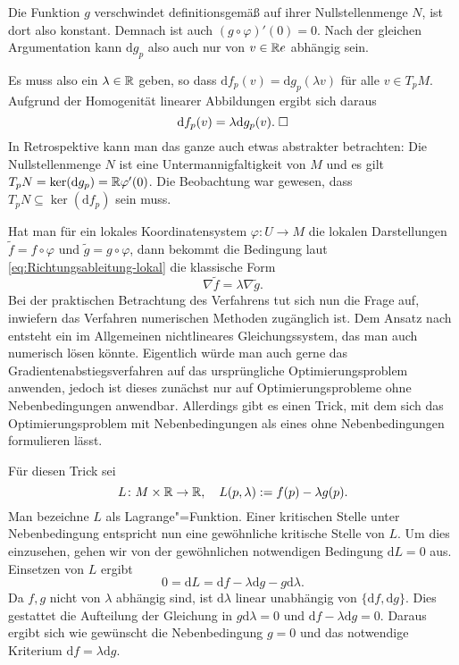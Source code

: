 Die Funktion $g$ verschwindet definitionsgemäß auf ihrer
Nullstellenmenge $N$, ist dort also konstant. Demnach
ist auch $(g\circ\varphi)'(0)=0$. Nach der gleichen Argumentation
kann $\mathrm dg_p$ also auch nur von $v\in\mathbb R e$ abhängig sein.

Es muss also ein $\lambda\in\mathbb R$ geben, so dass
$\mathrm df_p(v) = \mathrm dg_p(\lambda v)$ für alle $v\in T_p M$.
Aufgrund der Homogenität linearer Abbildungen ergibt sich daraus
\begin{equation}
\mathrm df_p(v) = \lambda\mathrm dg_p(v).\;\Box
\end{equation}
In Retrospektive kann man das ganze auch etwas abstrakter
betrachten: Die Nullstellenmenge $N$ ist eine Untermannigfaltigkeit von
$M$ und es gilt $T_p N=\operatorname{ker}(\mathrm dg_p)=\mathbb R\varphi'(0)$.
Die Beobachtung war gewesen, dass
$T_p N\subseteq \operatorname{ker}(\mathrm df_p)$
sein muss.

Hat man für ein lokales Koordinatensystem $\varphi\colon U\to M$ die
lokalen Darstellungen $\tilde f = f\circ\varphi$ und
$\tilde g = g\circ\varphi$, dann bekommt die Bedingung laut
\eqref{eq:Richtungsableitung-lokal} die klassische Form
\begin{equation}
\nabla\tilde f = \lambda\nabla\tilde g.
\end{equation}
Bei der praktischen Betrachtung des Verfahrens tut sich nun die
Frage auf, inwiefern das Verfahren numerischen Methoden zugänglich
ist. Dem Ansatz nach entsteht ein im Allgemeinen nichtlineares
Gleichungssystem, das man auch numerisch lösen könnte. Eigentlich
würde man auch gerne das Gradientenabstiegsverfahren auf das
ursprüngliche Optimierungsproblem anwenden, jedoch ist dieses
zunächst nur auf Optimierungsprobleme ohne Nebenbedingungen anwendbar.
Allerdings gibt es einen Trick, mit dem sich das Optimierungsproblem
mit Nebenbedingungen als eines ohne Nebenbedingungen formulieren lässt.

Für diesen Trick sei
\begin{equation}
L\colon M\times\mathbb R\to\mathbb R,\quad L(p,\lambda) := f(p)-\lambda g(p).
\end{equation}
Man bezeichne $L$ als Lagrange"=Funktion. Einer kritischen Stelle unter
Nebenbedingung entspricht nun eine gewöhnliche kritische Stelle von $L$.
Um dies einzusehen, gehen wir von der gewöhnlichen notwendigen
Bedingung $\mathrm dL=0$ aus. Einsetzen von $L$ ergibt%
\begin{equation}
0 = \mathrm dL = \mathrm df-\lambda\mathrm dg-g\mathrm d\lambda.
\end{equation}
Da $f,g$ nicht von $\lambda$ abhängig sind, ist $\mathrm d\lambda$
linear unabhängig von $\{\mathrm df,\mathrm dg\}$. Dies gestattet
die Aufteilung der Gleichung in $g\mathrm d\lambda=0$
und $\mathrm df-\lambda\mathrm dg=0$. Daraus ergibt sich wie
gewünscht die Nebenbedingung $g=0$ und das notwendige Kriterium
$\mathrm df=\lambda\mathrm dg$.

